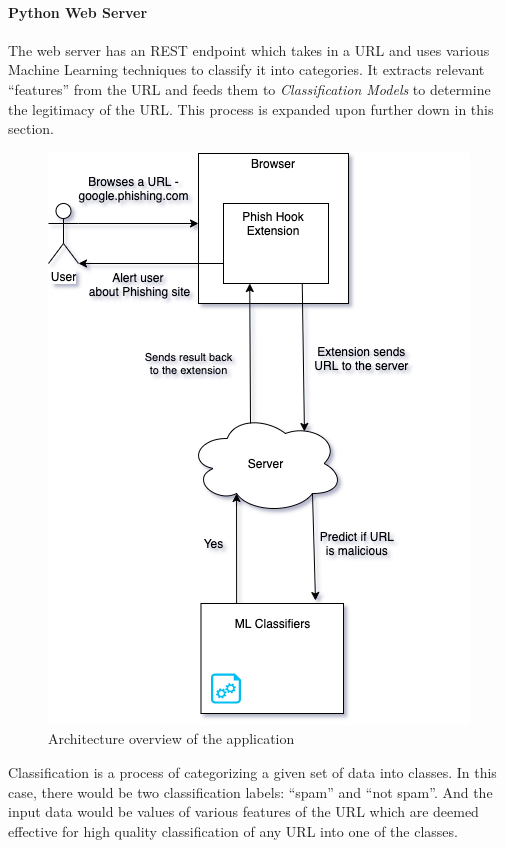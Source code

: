 \documentclass[conference]{IEEEtran}
\begin{document}
\paragraph{Python Web Server}
The web server has an REST endpoint which takes in a URL and uses various Machine Learning techniques to classify it into categories.
It extracts relevant ``features'' from the URL and feeds them to \emph{Classification Models} to determine the legitimacy of the URL.
This process is expanded upon further down in this section.

\begin{figure}[htbp]
\centerline{\includegraphics[scale=.5]{phish-arch.png}}
\caption{Architecture overview of the application}
\label{fig}
\end{figure}

\par Classification is a process of categorizing a given set of data into classes.
In this case, there would be two classification labels: ``spam'' and ``not spam''.
And the input data would be values of various features of the URL which are deemed effective for high quality classification of any URL into one of the classes.
\end{document}
